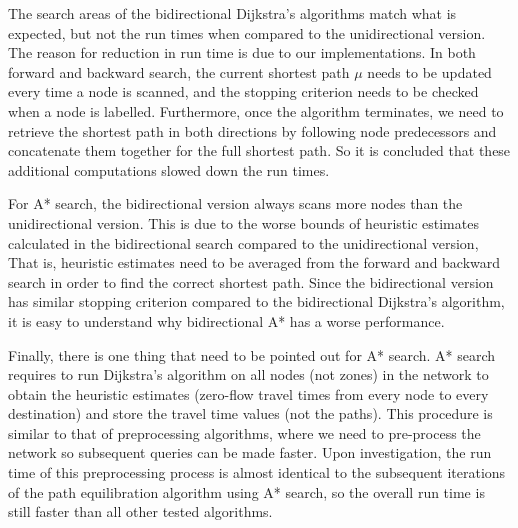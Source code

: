 The search areas of the bidirectional Dijkstra's algorithms match what is expected,
but not the run times when compared to the unidirectional version.
The reason for reduction in run time is due to our implementations.
In both forward and backward search,
the current shortest path $\mu$ needs to be updated every time a node is scanned,
and the stopping criterion needs to be checked when a node is labelled.
Furthermore,
once the algorithm terminates,
we need to retrieve the shortest path in both directions by following node predecessors and concatenate them together for the full shortest path.
So it is concluded that these additional computations slowed down the run times.

For A* search,
the bidirectional version always scans more nodes than the unidirectional version.
This is due to the worse bounds of heuristic estimates calculated in the bidirectional search compared to the unidirectional version,
That is, heuristic estimates need to be averaged from the forward and backward search in order to find the correct shortest path.
Since the bidirectional version has similar stopping criterion compared to the bidirectional Dijkstra's algorithm,
it is easy to understand why bidirectional A* has a worse performance.

Finally, there is one thing that need to be pointed out for A* search.
A* search requires to run Dijkstra's algorithm on all nodes (not zones) in the network to obtain the heuristic estimates (zero-flow travel times from every node to every destination) and store the travel time values (not the paths).
This procedure is similar to that of preprocessing algorithms,
where we need to pre-process the network so subsequent queries can be made faster.
Upon investigation, the run time of this preprocessing process is almost identical to the subsequent iterations of the path equilibration algorithm using A* search,
so the overall run time is still faster than all other tested algorithms.

